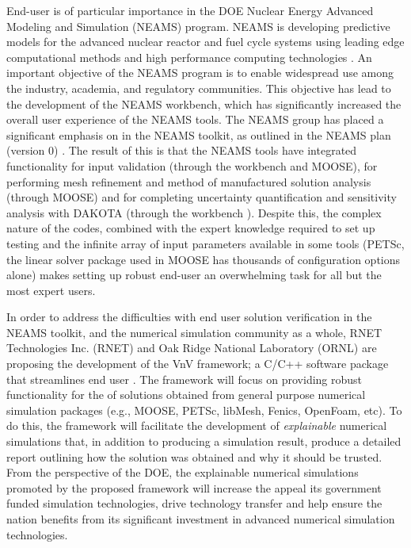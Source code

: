 End-user \VV is of particular importance in the DOE Nuclear Energy Advanced Modeling and Simulation (NEAMS) program. NEAMS is developing predictive models for the advanced nuclear reactor and fuel cycle systems using leading edge computational methods and high performance computing technologies \cite{NEAMS}. An important objective of the NEAMS program is to enable widespread use among the industry, academia, and regulatory communities\cite{NEAMS}. This objective has lead to the development of the NEAMS workbench, which has significantly increased the overall user experience of the NEAMS tools. The NEAMS group has placed a significant emphasis on \VV in the NEAMS toolkit, as outlined in the NEAMS \VV plan (version 0) \cite{}. The result of this is that the NEAMS tools have integrated functionality for input validation (through the workbench and MOOSE), for performing mesh refinement and method of manufactured solution analysis (through MOOSE) and for completing uncertainty quantification and sensitivity analysis with DAKOTA (through the workbench \cite{}). Despite this, the complex nature of the codes, combined with the expert knowledge required to set up \VV testing and the infinite array of input parameters available in some tools (PETSc, the linear solver package used in MOOSE has thousands of configuration options alone) makes setting up robust end-user \VV an overwhelming task for all but the most expert users.   

In order to address the difficulties with end user solution verification in the NEAMS toolkit, and the numerical simulation community as a whole, RNET Technologies Inc. (RNET) and Oak Ridge National Laboratory (ORNL) are proposing the development of the VnV framework; a C/C++ software package that streamlines end user \VV. The framework will focus on providing robust functionality for the \VV of solutions obtained from general purpose numerical simulation packages (e.g., MOOSE, PETSc, libMesh, Fenics, OpenFoam, etc). To do this, the framework will facilitate the development of \emph{explainable} numerical simulations that, in addition to producing a simulation result, produce a detailed report outlining how the solution was obtained and why it should be trusted. From the perspective of the DOE, the explainable numerical simulations promoted by the proposed framework will increase the appeal its government funded simulation technologies, drive technology transfer and help ensure the nation benefits from its significant investment in advanced numerical simulation technologies. 


